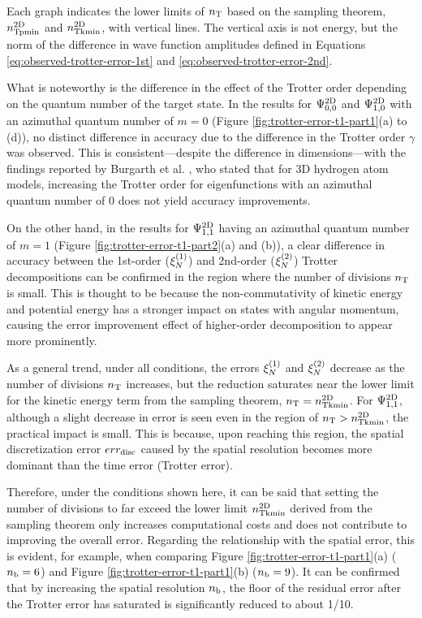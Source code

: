 \documentclass[wabun2025.tex]{subfiles}
\begin{document}
Each graph indicates the lower limits of $n_{\mathrm{T}}$ based on the sampling theorem,
$n_{\mathrm{Tpmin}}^{\mathrm{2D}}$ and $n_{\mathrm{Tkmin}}^{\mathrm{2D}}$, with vertical lines. The vertical axis is not
energy, but the norm of the difference in wave function amplitudes defined in
Equations \eqref{eq:observed-trotter-error-1st} and
\eqref{eq:observed-trotter-error-2nd}.

What is noteworthy is the difference in the effect of the Trotter order
depending on the quantum number of the target state. In the results for
$\Psi^{\mathrm{2D}}_{0,0}$ and $\Psi^{\mathrm{2D}}_{1,0}$ with an azimuthal quantum number of $m=0$
(Figure \ref{fig:trotter-error-t1-part1}(a) to (d)), no distinct difference in accuracy due
to the difference in the Trotter order $\gamma$ was observed. This is
consistent---despite the difference in dimensions---with the findings reported
by Burgarth et al. \cite{Burgarth2024.PhysRevResearch.6.043155}, who stated that
for 3D hydrogen atom models, increasing the Trotter order for eigenfunctions
with an azimuthal quantum number of 0 does not yield accuracy improvements.

On the other hand, in the results for $\Psi^{\mathrm{2D}}_{1,1}$ having an azimuthal
quantum number of $m=1$ (Figure \ref{fig:trotter-error-t1-part2}(a) and (b)), a clear difference in accuracy between
the 1st-order ($\xi_{N}^{(1)}$) and 2nd-order ($\xi_{N}^{(2)}$) Trotter decompositions can
be confirmed in the region where the number of divisions $n_{\mathrm{T}}$ is small. This is
thought to be because the non-commutativity of kinetic energy and potential
energy has a stronger impact on states with angular momentum, causing the error
improvement effect of higher-order decomposition to appear more prominently.

As a general trend, under all conditions, the errors $\xi_{N}^{(1)}$ and $\xi_{N}^{(2)}$
decrease as the number of divisions $n_{\mathrm{T}}$ increases, but the reduction saturates
near the lower limit for the kinetic energy term from the sampling theorem, $n_{\mathrm{T}}
= n_{\mathrm{Tkmin}}^{\mathrm{2D}}$. For $\Psi^{\mathrm{2D}}_{1,1}$, although a slight decrease in error is
seen even in the region of $n_{\mathrm{T}} > n_{\mathrm{Tkmin}}^{\mathrm{2D}}$, the practical impact is small.
This is because, upon reaching this region, the spatial discretization error
$err_{\mathrm{disc}}$ caused by the spatial resolution becomes more dominant than the time
error (Trotter error).

Therefore, under the conditions shown here, it can be said that setting the
number of divisions to far exceed the lower limit $n_{\mathrm{Tkmin}}^{\mathrm{2D}}$ derived from the
sampling theorem only increases computational costs and does not contribute to
improving the overall error. Regarding the relationship with the spatial error,
this is evident, for example, when comparing Figure
\ref{fig:trotter-error-t1-part1}(a) ($n_{\mathrm{b}}=6$) and Figure
\ref{fig:trotter-error-t1-part1}(b) ($n_{\mathrm{b}}=9$). It can be confirmed that by
increasing the spatial resolution $n_{\mathrm{b}}$, the floor of the residual error after
the Trotter error has saturated is significantly reduced to about 1/10.
\end{document}
